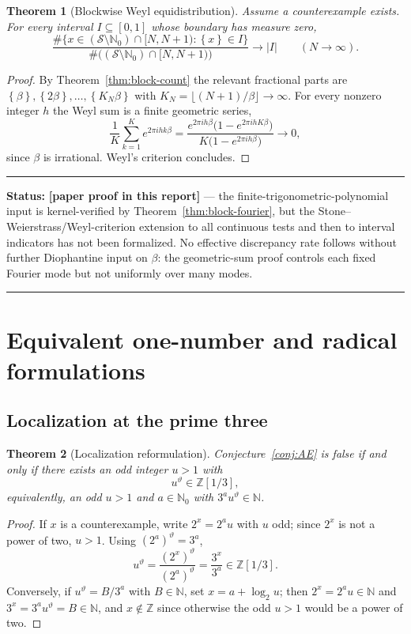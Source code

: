 \documentclass[11pt,oneside]{article}
\newtheorem{theorem}{Theorem}[section]
\theoremstyle{definition}
\theoremstyle{remark}
\newcommand{\N}{\mathbb N}
\newcommand{\Nzero}{\mathbb N_0}
\newcommand{\Z}{\mathbb Z}
\newcommand{\fract}[1]{\left\{#1\right\}}
\newcommand{\thetaq}{\vartheta}
\newcommand{\Sol}{\mathcal S}
\newcommand{\Zthree}{\Z[1/3]}
\newcommand{\statusnew}{\textcolor{newgreen}{\textbf{[paper proof in this report]}}}
\newenvironment{statusbox}[1]
{\begin{center}\begin{minipage}{0.94\textwidth}\raggedright\hbadness=10000\hrule\vspace{0.45em}\textbf{Status:} #1\par\vspace{0.35em}}
{\vspace{0.35em}\hrule\end{minipage}\end{center}}
\begin{document}
\begin{theorem}[Blockwise Weyl equidistribution]
\label{thm:block-equidist}
Assume a counterexample exists.  For every interval $I\subseteq[0,1]$ whose boundary has
measure zero,
\[
\frac{\#\{x\in(\Sol\setminus\Nzero)\cap[N,N+1):\fract x\in I\}}
{\#\bigl((\Sol\setminus\Nzero)\cap[N,N+1)\bigr)}\longrightarrow|I|
\qquad(N\to\infty).
\]
\end{theorem}

\begin{proof}
By Theorem~\ref{thm:block-count} the relevant fractional parts are
$\fract\beta,\fract{2\beta},\dots,\fract{K_N\beta}$ with
$K_N=\lfloor(N+1)/\beta\rfloor\to\infty$.  For every nonzero integer $h$ the Weyl sum is a
finite geometric series,
\[
\frac1K\sum_{k=1}^{K}e^{2\pi ihk\beta}
=\frac{e^{2\pi ih\beta}\bigl(1-e^{2\pi ihK\beta}\bigr)}{K\bigl(1-e^{2\pi ih\beta}\bigr)}
\longrightarrow0,
\]
since $\beta$ is irrational.  Weyl's criterion \cite{KuipersNiederreiter} concludes.
\end{proof}

\begin{statusbox}{\statusnew{} --- the finite-trigonometric-polynomial input is
kernel-verified by Theorem~\ref{thm:block-fourier}, but the Stone--Weierstrass/Weyl-criterion
extension to all continuous tests and then to interval indicators has not been formalized.
No effective discrepancy rate follows without further Diophantine input on $\beta$: the
geometric-sum proof controls each fixed Fourier mode but not uniformly over many modes.}
\end{statusbox}
\section{Equivalent one-number and radical formulations}
\label{sec:radical}

\subsection{Localization at the prime three}

\begin{theorem}[Localization reformulation]
\label{thm:localization}
Conjecture~\ref{conj:AE} is false if and only if there exists an odd integer $u>1$ with
\[
u^{\thetaq}\in\Zthree,
\]
equivalently, an odd $u>1$ and $a\in\Nzero$ with $3^au^{\thetaq}\in\N$.
\end{theorem}

\begin{proof}
If $x$ is a counterexample, write $2^x=2^au$ with $u$ odd; since $2^x$ is not a power of
two, $u>1$.  Using $(2^a)^{\thetaq}=3^a$,
\[
u^{\thetaq}=\frac{(2^x)^{\thetaq}}{(2^a)^{\thetaq}}=\frac{3^x}{3^a}\in\Zthree .
\]
Conversely, if $u^{\thetaq}=B/3^a$ with $B\in\N$, set $x=a+\log_2u$; then $2^x=2^au\in\N$
and $3^x=3^au^{\thetaq}=B\in\N$, and $x\notin\Z$ since otherwise the odd $u>1$ would be a
power of two.
\end{proof}
\end{document}
